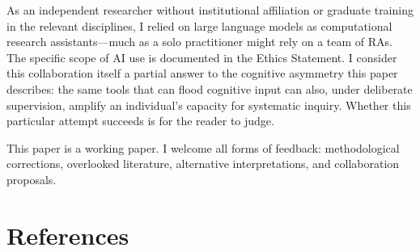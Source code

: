 \documentclass[a4paper,11pt,titlepage]{article}
\begin{document}
As an independent researcher without institutional affiliation or graduate training in the relevant disciplines, I relied on large language models as computational research assistants---much as a solo practitioner might rely on a team of RAs. The specific scope of AI use is documented in the Ethics Statement. I consider this collaboration itself a partial answer to the cognitive asymmetry this paper describes: the same tools that can flood cognitive input can also, under deliberate supervision, amplify an individual's capacity for systematic inquiry. Whether this particular attempt succeeds is for the reader to judge.

This paper is a working paper. I welcome all forms of feedback: methodological corrections, overlooked literature, alternative interpretations, and collaboration proposals.


\section*{References}
\end{document}
